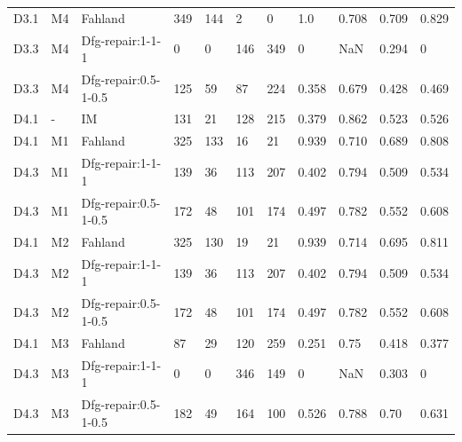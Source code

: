 \begin{table}[ht]
{\begin{tabular}{lll|llllllll|}
			D3.1      & M4              & Fahland   &  349   & 144   &  2   &  0   & 1.0       &   0.708        &   0.709       &  0.829         \\
			
			D3.3      & M4              & Dfg-repair:1-1-1       &  0   &  0  &   146  &  349   &  0     &      NaN     & 0.294        & 0   \\
			D3.3      & M4              & Dfg-repair:0.5-1-0.5       &  125   &  59  &   87  &  224   &  0.358     &      0.679     & 0.428        & 0.469   \\
			\hline
			D4.1      & -              & IM &  131   &  21  & 128    &  215   &    0.379    & 0.862           &   0.523       &    0.526     \\
			D4.1      & M1              & Fahland   &  325   &  133  &  16   & 21    &   0.939     &  0.710         &  0.689       & 0.808                \\
			
			D4.3      & M1              & Dfg-repair:1-1-1       &  139   & 36   & 113    &   207  &   0.402     &   0.794        &   0.509       &   0.534                   \\
			D4.3      & M1              & Dfg-repair:0.5-1-0.5       &  172   & 48   & 101    &   174  &   0.497     &   0.782       &   0.552       &   0.608                   \\
			\hline
			D4.1      & M2              & Fahland   & 325    &  130  & 19    &  21   & 0.939       &    0.714       &  0.695        &  0.811                \\
			
			D4.3      & M2              & Dfg-repair:1-1-1     &  139   & 36   & 113    &   207  &   0.402     &   0.794        &   0.509       &   0.534              \\
			D4.3      & M2              & Dfg-repair:0.5-1-0.5     &  172   & 48   & 101    &   174  &   0.497     &   0.782        &   0.552       &   0.608              \\
			\hline
			D4.1      & M3              & Fahland   & 87    &  29  & 120    &  259   & 0.251       &    0.75       &  0.418        &  0.377                    \\
			D4.3      & M3              & Dfg-repair:1-1-1       &  0   &  0  & 346    &  149   &  0      &   NaN        &   0.303       &  0       \\ 
			D4.3      & M3              & Dfg-repair:0.5-1-0.5       &  182   &  49  & 164    &  100   &  0.526      &   0.788        &   0.70       &  0.631      \\ 
			

\end{tabular}}
\end{table}
